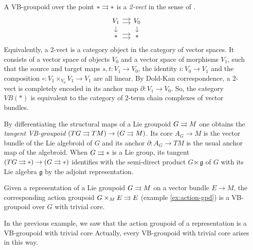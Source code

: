 \begin{example}\label{ex:2vect}
A VB-groupoid over the point $*\rightrightarrows *$ is a \emph{2-vect} in the sense of \cite{bc04}.
\begin{equation}
  \begin{tikzcd}[sep=small, cells={text width={width("$M$")}}, align=center]
    V_1 \ar[yshift=3pt]{r} \ar[yshift=-2.3pt]{r} \ar{d} & V_0 \ar{d} \\
    * \ar[yshift=3pt]{r} \ar[yshift=-2.3pt]{r} & *
  \end{tikzcd}
\end{equation}
Equivalently, a 2-vect is a category object in the category of vector spaces.
It consists of a vector space of objects $V_0$ and a vector space of morphisms $V_1$, such that the source and target maps $s, t\colon V_1\to V_0$, the identity $i\colon V_0\to V_1$ and the composition $\circ\colon V_1\times_{V_0}V_1\to V_1$ are all linear.
By Dold-Kan correspondence, a 2-vect is completely encoded in its anchor map $\partial\colon V_1\to V_0$.
So, the category $VB(*)$ is equivalent to the category of 2-term chain complexes of vector bundles.
\end{example}

\begin{example}
By differentiating the structural maps of a Lie groupoid $G\rightrightarrows M$ one obtains the \emph{tangent VB-groupoid} $(TG\rightrightarrows TM)\to (G\rightrightarrows M)$.
Its core $A_G\to M$ is the vector bundle of the Lie algebroid of $G$ and its anchor $\partial\colon A_G\to TM$ is the usual anchor map of the algebroid.
When $G\rightrightarrows *$ is a Lie group, its tangent $(TG\rightrightarrows *)\to (G\rightrightarrows *)$ identifies with the semi-direct product $G\ltimes \mathfrak g$ of $G$ with its Lie algebra $\mathfrak g$ by the adjoint representation.
\end{example}

\begin{example}
Given a representation of a Lie groupoid $G\rightrightarrows M$ on a vector bundle $E\to M$, the corresponding action groupoid $G\times_M E\rightrightarrows E$ (example \ref{ex:action-gpd}) is a VB-groupoid over $G$ with trivial core.
\end{example}

In the previous example, we saw that the action groupoid of a representation is a VB-groupoid with trivial core
Actually, every VB-groupoid with trivial core arises in this way.

